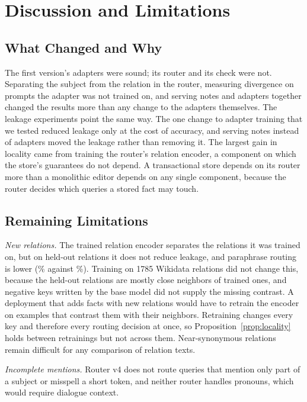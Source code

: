 \documentclass[journal,10pt]{IEEEtran}
\begin{document}
\section{Discussion and Limitations}
\label{sec:limits}

\subsection{What Changed and Why}
The first version's adapters were sound; its router and its check were not. Separating
the subject from the relation in the router, measuring divergence on prompts the adapter
was not trained on, and serving notes and adapters together changed the results more than
any change to the adapters themselves. The leakage experiments point the same way. The
one change to adapter training that we tested reduced leakage only at the cost of
accuracy, and serving notes instead of adapters moved the leakage rather than removing
it. The largest gain in locality came from training the router's relation encoder,
a component on which the store's guarantees do not depend. A transactional store depends
on its router more
than a monolithic editor depends on any single component, because the router decides
which queries a stored fact may touch.

\subsection{Remaining Limitations}
\emph{New relations.} The trained relation encoder separates the relations it was
trained on, but on held-out relations it does not reduce leakage, and paraphrase routing
is lower (\xParaHeldRoutePct\% against \xParaSeenRoutePct\%). Training on 1785 Wikidata
relations did not change this, because the held-out relations are mostly close
neighbors of trained ones, and negative keys written by the base model did not supply the
missing contrast. A deployment that adds facts with new relations would have
to retrain the encoder on examples that contrast them with their neighbors. Retraining changes every key and
therefore every routing decision at once, so Proposition~\ref{prop:locality} holds
between retrainings but not across them. Near-synonymous relations remain difficult for
any comparison of relation texts.

\emph{Incomplete mentions.} Router v4 does not route queries that mention only part of a
subject or misspell a short token, and neither router handles pronouns, which would
require dialogue context.
\end{document}
